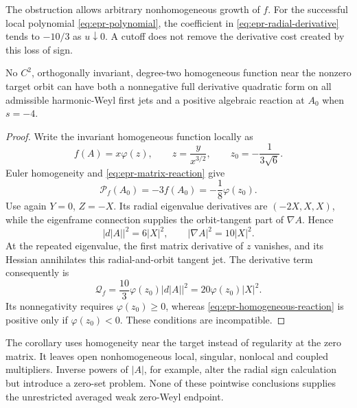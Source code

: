 The obstruction allows arbitrary nonhomogeneous growth of $f$.
For the successful local polynomial \eqref{eq:epr-polynomial},
the coefficient in \eqref{eq:epr-radial-derivative} tends to
$-10/3$ as $u\downarrow0$.  A cutoff does not remove the derivative
cost created by this loss of sign.

\begin{corollary}
\label{cor:epr-homogeneous-multiplier}
No $C^2$, orthogonally invariant, degree-two homogeneous function
near the nonzero target orbit can have both a nonnegative full
derivative quadratic form on all admissible harmonic-Weyl first
jets and a positive algebraic reaction at $A_0$ when $s=-4$.
\end{corollary}

\begin{proof}
Write the invariant homogeneous function locally as
\[
 f(A)=x\varphi(z),\qquad z=\frac{y}{x^{3/2}},
 \qquad z_0=-\frac1{3\sqrt6}.
\]
Euler homogeneity and \eqref{eq:epr-matrix-reaction} give
\begin{equation}\label{eq:epr-homogeneous-reaction}
 \mathcal P_f(A_0)=-3f(A_0)=-\frac18\varphi(z_0).
\end{equation}
Use again $Y=0$, $Z=-X$.  Its radial eigenvalue derivatives are
$(-2X,X,X)$, while the eigenframe connection supplies the
orbit-tangent part of $\nabla A$.  Hence
\[
 |d|A||^2=6|X|^2,\qquad |\nabla A|^2=10|X|^2.
\]
At the repeated eigenvalue, the first matrix derivative of $z$
vanishes, and its Hessian annihilates this radial-and-orbit tangent
jet.  The derivative term consequently is
\begin{equation}\label{eq:epr-homogeneous-derivative}
 \mathcal Q_f=\frac{10}{3}\varphi(z_0)|d|A||^2
                         =20\varphi(z_0)|X|^2.
\end{equation}
Its nonnegativity requires $\varphi(z_0)\geq0$, whereas
\eqref{eq:epr-homogeneous-reaction} is positive only if
$\varphi(z_0)<0$.  These conditions are incompatible.
\end{proof}

The corollary uses homogeneity near the target instead of regularity
at the zero matrix.  It leaves open nonhomogeneous local, singular,
nonlocal and coupled multipliers.  Inverse powers of $|A|$, for
example, alter the radial sign calculation but introduce a zero-set
problem.  None of these pointwise conclusions supplies the
unrestricted averaged weak zero-Weyl endpoint.
